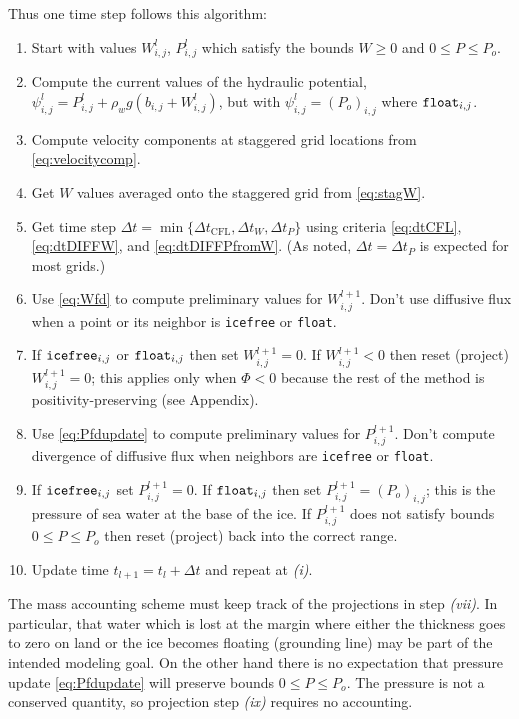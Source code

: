 \documentclass[11pt,final]{amsart}%
\newcommand{\Wlij}{W^l_{i,j}}
\newcommand{\Plij}{P^l_{i,j}}
\begin{document}
Thus one time step follows this algorithm:
\renewcommand{\labelenumi}{\emph{(\roman{enumi})}}
\begin{enumerate}
\item Start with values $\Wlij$, $\Plij$ which satisfy the bounds $W\ge 0$ and $0 \le P \le P_o$.
\item Compute the current values of the hydraulic potential, $\psi_{i,j}^l = \Plij + \rho_w g(b_{i,j} + \Wlij)$, but with $\psi_{i,j}^l=(P_o)_{i,j}$ where $\text{\texttt{float}}_{i,j}$.
\item Compute velocity components at staggered grid locations from \eqref{eq:velocitycomp}.   %
\item Get $W$ values averaged onto the staggered grid from \eqref{eq:stagW}.
\item Get time step $\Delta t = \min\{\Delta t_{\text{CFL}}, \Delta t_W, \Delta t_P\}$ using criteria \eqref{eq:dtCFL}, \eqref{eq:dtDIFFW}, and \eqref{eq:dtDIFFPfromW}.  (As noted, $\Delta t = \Delta t_P$ is expected for most grids.)
\item Use \eqref{eq:Wfd} to compute preliminary values for $W_{i,j}^{l+1}$.  Don't use diffusive flux when a point or its neighbor is \texttt{icefree} or \texttt{float}.
\item If $\text{\texttt{icefree}}_{i,j}$ or $\text{\texttt{float}}_{i,j}$ then set $W_{i,j}^{l+1}=0$.  If $W_{i,j}^{l+1}<0$ then reset (project) $W_{i,j}^{l+1}=0$; this applies only when $\Phi<0$ because the rest of the method is positivity-preserving (see Appendix).
\item Use \eqref{eq:Pfdupdate} to compute preliminary values for $P_{i,j}^{l+1}$.  Don't compute divergence of diffusive flux when neighbors are \texttt{icefree} or \texttt{float}.
\item If $\text{\texttt{icefree}}_{i,j}$ set $P_{i,j}^{l+1}=0$.  If $\text{\texttt{float}}_{i,j}$ then set $P_{i,j}^{l+1} = (P_o)_{i,j}$; this is the pressure of sea water at the base of the ice.  If $P_{i,j}^{l+1}$ does not satisfy bounds $0 \le P \le P_o$ then reset (project) back into the correct range.
\item Update time $t_{l+1}=t_l+\Delta t$ and repeat at \emph{(i)}.
\end{enumerate}

The mass accounting scheme must keep track of the projections in step \emph{(vii)}.  In particular, that water which is lost at the margin where either the thickness goes to zero on land or the ice becomes floating (grounding line) may be part of the intended modeling goal.  On the other hand there is no expectation that pressure update \eqref{eq:Pfdupdate} will preserve bounds $0\le P \le P_o$.  The pressure is not a conserved quantity, so projection step \emph{(ix)} requires no accounting.
\end{document}

